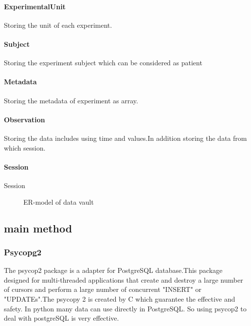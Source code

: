 \documentclass[conference]{IEEEtran}
\begin{document}
\paragraph{ExperimentalUnit} Storing the unit of each experiment.
\paragraph{Subject} Storing the experiment subject which can be considered as patient
\paragraph{Metadata} Storing the metadata of experiment as array.
\paragraph{Observation} Storing the data includes using time and values.In addition storing the data from which session. 
\paragraph{Session} Session
\begin{figure}[htbp]
	\caption{ER-model of data vault}
	\label{project}
\end{figure}
\subsection{main method}
\subsubsection{Psycopg2}
The psycop2 package is a adapter for PostgreSQL database.This package designed for multi-threaded applications that create and destroy a large number of cursors and perform a large number of concurrent "INSERT" or "UPDATEs".The psycopy 2 is created by C which guarantee the effective and safety. In python many data can use directly in PostgreSQL. So using psycop2 to deal with postgreSQL is very effective.\cite{b7}
\end{document}
